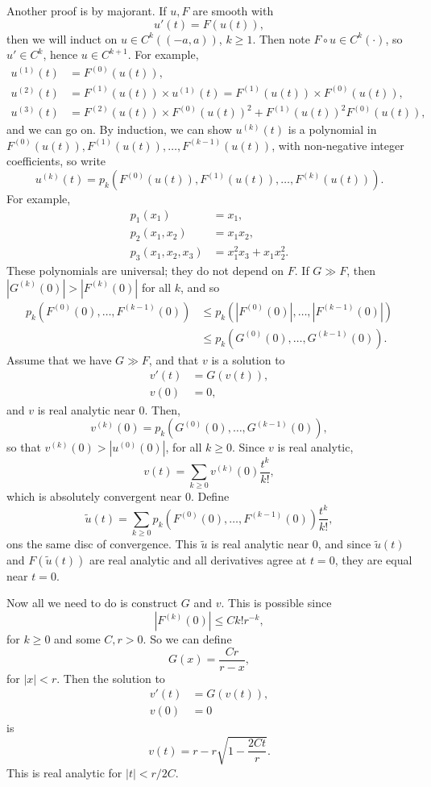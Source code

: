 \documentclass[12pt]{article}
\begin{document}
\begin{proofbox}
	Another proof is by majorant. If $u, F$ are smooth with
	\[
	u'(t) = F(u(t)),
	\]
	then we will induct on $u \in C^k((-a, a))$, $k \geq 1$. Then note $F \circ u \in C^k(\cdot)$, so $u' \in C^k$, hence $u \in C^{k+1}$. For example,
	\begin{align*}
		u^{(1)}(t) &= F^{(0)}(u(t)), \\
		u^{(2)}(t) &= F^{(1)}(u(t)) \times u^{(1)}(t) = F^{(1)}(u(t)) \times F^{(0)}(u(t)), \\
		u^{(3)}(t) &= F^{(2)}(u(t)) \times F^{(0)}(u(t))^2 + F^{(1)}(u(t))^2 F^{(0)}(u(t)),
	\end{align*}
	and we can go on. By induction, we can show $u^{(k)}(t)$ is a polynomial in $F^{(0)}(u(t)), F^{(1)}(u(t)), \ldots, F^{(k-1)}(u(t))$, with non-negative integer coefficients, so write
	\[
	u^{(k)}(t) = p_k(F^{(0)}(u(t)), F^{(1)}(u(t)), \ldots, F^{(k)}(u(t))).
	\]
	For example,
	\begin{align*}
		p_1(x_1) &= x_1, \\
		p_2(x_1, x_2) &= x_1 x_2, \\
		p_3(x_1, x_2, x_3) &= x_1^2 x_3 + x_1x_2^2.
	\end{align*}
	These polynomials are universal; they do not depend on $F$. If $G \gg F$, then $|G^{(k)}(0)| > |F^{(k)}(0)|$ for all $k$, and so
	\begin{align*}
		p_k(F^{(0)}(0), \ldots, F^{(k-1)}(0)) &\leq p_k(|F^{(0)}(0)|, \ldots, |F^{(k-1)}(0)|) \\
						      &\leq p_k(G^{(0)}(0), \ldots, G^{(k-1)}(0)).
	\end{align*}
	Assume that we have $G \gg F$, and that $v$ is a solution to
	\begin{align*}
		v'(t) &= G(v(t)), \\
		v(0) &= 0,
	\end{align*}
	and $v$ is real analytic near $0$. Then,
	\[
	v^{(k)}(0) = p_k(G^{(0)}(0), \ldots, G^{(k-1)}(0)),
	\]
	so that $v^{(k)}(0) > |u^{(0)}(0)|$, for all $k \geq 0$. Since $v$ is real analytic,
	\[
	v(t) = \sum_{k \geq 0} v^{(k)}(0) \frac{t^k}{k!},
	\]
	which is absolutely convergent near $0$. Define
	\[
	\tilde u(t) = \sum_{k \geq 0} p_k(F^{(0)}(0), \ldots, F^{(k-1)}(0)) \frac{t^k}{k!},
	\]
	ons the same disc of convergence. This $\tilde u$ is real analytic near $0$, and since $\tilde u(t)$ and $F(\tilde u(t))$ are real analytic and all derivatives agree at $t = 0$, they are equal near $t = 0$.

	Now all we need to do is construct $G$ and $v$. This is possible since
	\[
	|F^{(k)}(0)| \leq C k! r^{-k},
	\]
	for $k \geq 0$ and some $C, r > 0$. So we can define
	\[
	G(x) = \frac{Cr}{r - x},
	\]
	for $|x| < r$. Then the solution to
	\begin{align*}
		v'(t) &= G(v(t)), \\
		v(0) &= 0
	\end{align*}
	is
	\[
		v(t) = r - r \sqrt{1 - \frac{2 C t}{r}}.
	\]
	This is real analytic for $|t| < r/2C$.
\end{proofbox}
\end{document}
